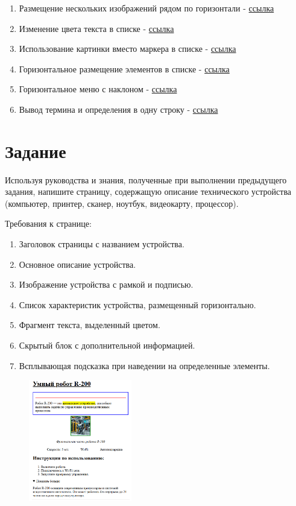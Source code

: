\documentclass[a4paper,12pt]{extarticle}
\begin{document}
\begin{enumerate}
  \item Размещение нескольких изображений рядом по горизонтали - \href{https://htmlbook.ru/faq/kak-razmestit-neskolko-kartinok-ryadom-po-gorizontali}{ссылка}
  \item Изменение цвета текста в списке - \href{https://htmlbook.ru/faq/kak-izmenit-tsvet-teksta-v-spiske}{ссылка}
  \item Использование картинки вместо маркера в списке - \href{https://htmlbook.ru/faq/kak-vmesto-simvola-markera-ispolzovat-kartinku}{ссылка}
  \item Горизонтальное размещение элементов в списке - \href{https://htmlbook.ru/faq/kak-razmestit-elementy-spiska-gorizontalno}{ссылка}
  \item Горизонтальное меню с наклоном - \href{https://htmlbook.ru/faq/kak-sdelat-gorizontalnoe-menyu-s-naklonom}{ссылка}
  \item  Вывод термина и определения в одну строку - \href{https://htmlbook.ru/faq/kak-vyvesti-termin-i-opredelenie-v-odnu-stroku}{ссылка}
\end{enumerate}


\section{Задание}

Используя руководства и знания, полученные при выполнении предыдущего задания, напишите страницу, содержащую описание технического устройства (компьютер, принтер, сканер, ноутбук, видеокарту, процессор).

Требования к странице:
\begin{enumerate}
  \item Заголовок страницы с названием устройства.
  \item Основное описание устройства.
  \item Изображение устройства с рамкой и подписью.
  \item Список характеристик устройства, размещенный горизонтально.
  \item Фрагмент текста, выделенный цветом.
  \item Скрытый блок с дополнительной информацией.
  \item Всплывающая подсказка при наведении на определенные элементы.
\end{enumerate}

\begin{figure}[!ht]
    \centering
    \includegraphics[width=0.4\textwidth]{lab2_task2.png}
\end{figure}
\end{document}
